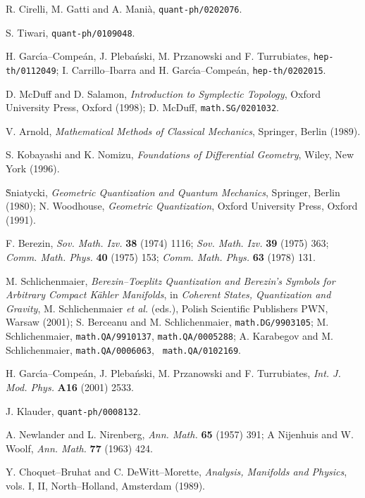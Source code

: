 \documentclass[a4paper,a4paper]{article}
\begin{document}
\begin{thebibliography}{99}
R. Cirelli, M. Gatti and A. Mani\`a, {\tt quant-ph/0202076}.

S. Tiwari, {\tt quant-ph/0109048}.

H. Garc\'{\i}a--Compe\'an, J. Pleba\'nski, M. Przanowski and F. 
Turrubiates, {\tt hep-th/0112049};
I. Carrillo--Ibarra and H. Garc\'{\i}a--Compe\'an, {\tt hep-th/0202015}.

D. McDuff and D. Salamon, {\it Introduction to Symplectic Topology},
Oxford University Press, Oxford (1998);
D. McDuff, {\tt math.SG/0201032}.

V. Arnold, {\it Mathematical Methods of Classical Mechanics}, Springer, Berlin (1989).

S. Kobayashi and K. Nomizu, {\it Foundations of Differential Geometry}, Wiley, 
New York (1996).

\`Sniatycki, {\it Geometric Quantization and Quantum Mechanics}, Springer, Berlin (1980);
N. Woodhouse, {\it Geometric Quantization}, Oxford University Press, Oxford (1991).

F. Berezin, {\it Sov. Math. Izv.} {\bf 38} (1974) 1116; 
{\it Sov. Math. Izv.} {\bf 39} (1975) 363;
{\it Comm. Math. Phys.} {\bf 40} (1975) 153;
{\it Comm. Math. Phys.} {\bf 63} (1978) 131.

M. Schlichenmaier, {\it Berezin--Toeplitz Quantization and Berezin's 
Symbols for Arbitrary Compact K\"ahler Manifolds}, in {\it Coherent 
States, Quantization and Gravity}, M. Schlichenmaier {\it et al.} (eds.),
Polish Scientific Publishers PWN, Warsaw (2001);
S. Berceanu and M. Schlichenmaier, {\tt math.DG/9903105};
M. Schlichenmaier, {\tt math.QA/9910137}, {\tt math.QA/0005288}; 
A. Karabegov and M. Schlichenmaier, {\tt math.QA/0006063}, {\tt  
math.QA/0102169}.

H. Garc\'{\i}a--Compe\'an, J. Pleba\'nski, M. Przanowski and F. 
Turrubiates, {\it Int. J. Mod. Phys.} {\bf A16} (2001) 2533.

J. Klauder, {\tt quant-ph/0008132}.

A. Newlander and L. Nirenberg, {\it Ann. Math.} {\bf 65} (1957) 391;
A Nijenhuis and W. Woolf, {\it Ann. Math.} {\bf 77} (1963) 424.

Y. Choquet--Bruhat and C. DeWitt--Morette, {\it Analysis, Manifolds and 
Physics}, vols. I, II, North--Holland, Amsterdam (1989).


\end{thebibliography}
\end{document}
